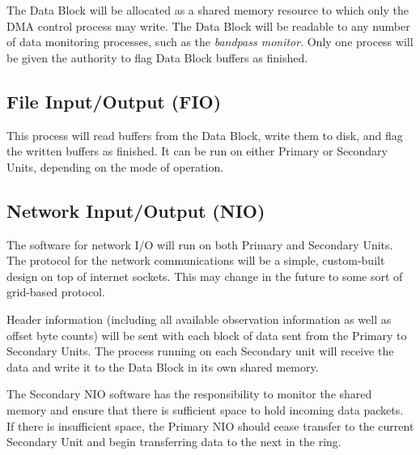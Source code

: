 The Data Block will be allocated as a shared memory resource to which
only the DMA control process may write.  The Data Block will be
readable to any number of data monitoring processes, such as the
\emph{bandpass monitor}.  Only one process will be given the authority
to flag Data Block buffers as finished.

\subsection{File Input/Output (FIO)}

This process will read buffers from the Data Block, write them to
disk, and flag the written buffers as finished.  It can be run on
either Primary or Secondary Units, depending on the mode of operation.

\subsection{Network Input/Output (NIO)}

The software for network I/O will run on both Primary and Secondary
Units.  The protocol for the network communications will be a simple,
custom-built design on top of internet sockets.  This may change in
the future to some sort of grid-based protocol.

Header information (including all available observation information as
well as offset byte counts) will be sent with each block of data sent
from the Primary to Secondary Units.  The process running on each
Secondary unit will receive the data and write it to the Data Block in
its own shared memory.

The Secondary NIO software has the responsibility to monitor the
shared memory and ensure that there is sufficient space to hold
incoming data packets.  If there is insufficient space, the Primary
NIO should cease transfer to the current Secondary Unit and begin
transferring data to the next in the ring.
